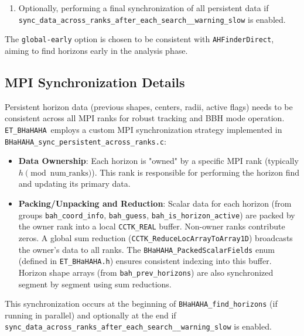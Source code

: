 \documentclass[a4paper,11pt]{article}
\newcommand{\thorn}[1]{{\tt #1}}
\newcommand{\file}[1]{{\tt #1}}
\newcommand{\BHaHAHA}{\thorn{ET\_BHaHAHA}} %
\begin{document}
\begin{description}
\begin{enumerate}
\begin{itemize}
                \item Processing results: if successful, updating persistent Cactus GFs using \texttt{write\_persistent\_from\_bhahaha\_params\_and\_data} and outputting diagnostics using \texttt{bah\_diagnostics\_file\_output}. If failed, setting flags to ensure a robust guess next time.
            \end{itemize}
        \item Optionally, performing a final synchronization of all persistent data if \texttt{sync\_data\_across\_ranks\_after\_each\_search\_\_warning\_slow} is enabled.
    \end{enumerate}
    The \texttt{global-early} option is chosen to be consistent with \thorn{AHFinderDirect}, aiming to find horizons early in the analysis phase.
\end{description}

\subsection{MPI Synchronization Details}
\label{ssec:mpi_sync_detail}
Persistent horizon data (previous shapes, centers, radii, active flags) needs to be consistent across all MPI ranks for robust tracking and BBH mode operation. \BHaHAHA\ employs a custom MPI synchronization strategy implemented in \texttt{BHaHAHA\_sync\_persistent\_across\_ranks.c}:
\begin{itemize}
    \item \textbf{Data Ownership}: Each horizon is "owned" by a specific MPI rank (typically $h \pmod{\text{num\_ranks}}$). This rank is responsible for performing the horizon find and updating its primary data.
    \item \textbf{Packing/Unpacking and Reduction}:
        Scalar data for each horizon (from groups \texttt{bah\_coord\_info}, \texttt{bah\_guess}, \texttt{bah\_is\_horizon\_active}) are packed by the owner rank into a local \texttt{CCTK\_REAL} buffer. Non-owner ranks contribute zeros. A global sum reduction (\texttt{CCTK\_ReduceLocArrayToArray1D}) broadcasts the owner's data to all ranks. The \texttt{BHaHAHA\_PackedScalarFields} enum (defined in \file{ET\_BHaHAHA.h}) ensures consistent indexing into this buffer. Horizon shape arrays (from \texttt{bah\_prev\_horizons}) are also synchronized segment by segment using sum reductions.
\end{itemize}
This synchronization occurs at the beginning of \texttt{BHaHAHA\_find\_horizons} (if running in parallel) and optionally at the end if \texttt{sync\_data\_across\_ranks\_after\_each\_search\_\_warning\_slow} is enabled.
\end{document}
